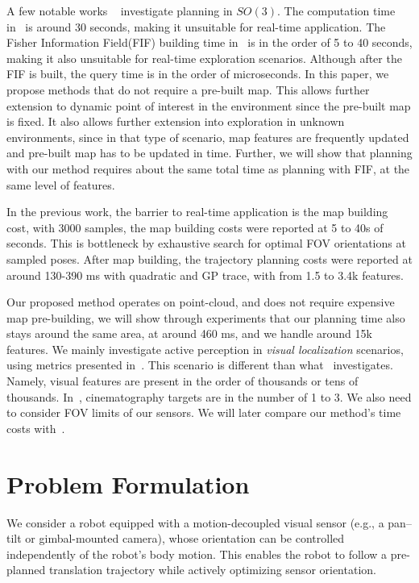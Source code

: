 \documentclass[letterpaper, 10 pt, conference]{ieeeconf}  %
\begin{document}
A few notable works ~\cite{zhang2020fisher, nageli2017real, watterson2018trajectory} investigate planning in $SO(3)$. The computation time in~\cite{watterson2018trajectory} is around 30 seconds, making it unsuitable for real-time application. The Fisher Information Field(FIF) building time in~\cite{zhang2020fisher} is in the order of 5 to 40 seconds, making it also unsuitable for real-time exploration scenarios.  Although after the FIF is built, the query time is in the order of microseconds. In this paper, we propose methods that do not require a pre-built map. This allows further extension to dynamic point of interest in the environment since the pre-built map is fixed. It also allows further extension into exploration in unknown environments, since in that type of scenario, map features are frequently updated and pre-built map has to be updated in time.  Further, we will show that planning with our method requires about the same total time as planning with FIF, at the same level of features.

In the previous work, the barrier to real-time application \cite{zhang2020fisher,zhang2019beyond} is the map building cost, with 3000 samples, the map building costs were reported at 5 to 40s of seconds. This is bottleneck by exhaustive search for optimal FOV orientations at sampled poses. After map building, the trajectory planning costs were reported at around 130-390 ms with quadratic and GP trace, with from 1.5 to 3.4k features.

Our proposed method operates on point-cloud, and does not require expensive map pre-building, we will show through experiments that our planning time also stays around the same area, at around 460 ms, and we handle around 15k features.
We mainly investigate active perception in \emph{visual localization} scenarios, using metrics presented in~\cite{zhang2020fisher}. This scenario is different than what~\cite{nageli2017real} investigates. Namely, visual features are present in the order of thousands or tens of thousands. In~\cite{nageli2017real}, cinematography targets are in the number of 1 to 3. We also need to consider FOV limits of our sensors. We will later compare our method's time costs with~\cite{nageli2017real}.

\section{Problem Formulation}
\label{sec:problem}

We consider a robot equipped with a motion-decoupled visual sensor (e.g., a pan--tilt or gimbal-mounted camera), whose orientation can be controlled independently of the robot's body motion. This enables the robot to follow a pre-planned translation trajectory while actively optimizing sensor orientation.
\end{document}

